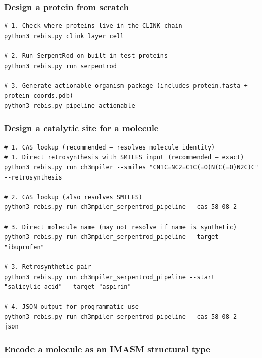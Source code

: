 \documentclass[12pt,a4paper]{article}
\begin{document}
\hypertarget{design-a-protein-from-scratch}{%
\subsubsection{Design a protein from
scratch}\label{design-a-protein-from-scratch}}

\begin{verbatim}
# 1. Check where proteins live in the CLINK chain
python3 rebis.py clink layer cell

# 2. Run SerpentRod on built-in test proteins
python3 rebis.py run serpentrod

# 3. Generate actionable organism package (includes protein.fasta + protein_coords.pdb)
python3 rebis.py pipeline actionable
\end{verbatim}

\hypertarget{design-a-catalytic-site-for-a-molecule}{%
\subsubsection{Design a catalytic site for a
molecule}\label{design-a-catalytic-site-for-a-molecule}}

\begin{verbatim}
# 1. CAS lookup (recommended — resolves molecule identity)
# 1. Direct retrosynthesis with SMILES input (recommended — exact)
python3 rebis.py run ch3mpiler --smiles "CN1C=NC2=C1C(=O)N(C(=O)N2C)C" --retrosynthesis

# 2. CAS lookup (also resolves SMILES)
python3 rebis.py run ch3mpiler_serpentrod_pipeline --cas 58-08-2

# 3. Direct molecule name (may not resolve if name is synthetic)
python3 rebis.py run ch3mpiler_serpentrod_pipeline --target "ibuprofen"

# 3. Retrosynthetic pair
python3 rebis.py run ch3mpiler_serpentrod_pipeline --start "salicylic_acid" --target "aspirin"

# 4. JSON output for programmatic use
python3 rebis.py run ch3mpiler_serpentrod_pipeline --cas 58-08-2 --json
\end{verbatim}

\hypertarget{encode-a-molecule-as-an-imasm-structural-type}{%
\subsubsection{Encode a molecule as an IMASM structural
type}\label{encode-a-molecule-as-an-imasm-structural-type}}
\end{document}
